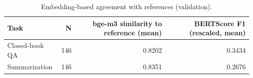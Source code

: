 \begin{table}[t]
\centering
\caption{Embedding-based agreement with references (validation).}
\label{tab:t8_semantic_agreement}
\begin{tabular}{lrrr}
\toprule
Task & N & bge-m3 similarity to reference (mean) & BERTScore F1 (rescaled, mean) \\
\midrule
Closed-book QA & 146 & 0.8202 & 0.3434 \\
Summarization & 146 & 0.8351 & 0.2676 \\
\bottomrule
\end{tabular}
\end{table}
